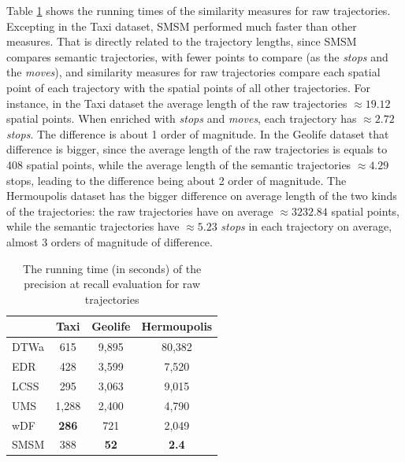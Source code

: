Table \ref{tab:running_time_raw} shows the running times of the similarity measures for raw trajectories. Excepting in the Taxi dataset, SMSM performed much faster than other measures. That is directly related to the trajectory lengths, since SMSM compares semantic trajectories, with fewer points to compare (as the \emph{stops} and the \emph{moves}), and similarity measures for raw trajectories compare each spatial point of each trajectory with the spatial points of all other trajectories. For instance, in the Taxi dataset the average length of the raw trajectories $\approx 19.12$ spatial points. When enriched with \emph{stops} and \emph{moves}, each trajectory has $\approx 2.72$ \emph{stops}. The difference is about 1 order of magnitude. In the Geolife dataset that difference is bigger, since the average length of the raw trajectories is equals to 408 spatial points, while the average length of the semantic trajectories $\approx 4.29$ stops, leading to the difference being about 2 order of magnitude. The Hermoupolis dataset has the bigger difference on average length of the two kinds of the trajectories: the raw trajectories have on average $\approx 3232.84$ spatial points, while the semantic trajectories have $\approx 5.23$ \emph{stops} in each trajectory on average, almost 3 orders of magnitude of difference.

\begin{table}[ht!]
  \scriptsize
  \centering
  \begin{tabular}{|l|c|c|c|}
  \hline
& Taxi & Geolife & Hermoupolis\\
  \hline
DTWa	& 615	& 9,895	& 80,382\\
EDR		& 428	& 3,599	& 7,520\\
LCSS	& 295	& 3,063	& 9,015\\
UMS		& 1,288	& 2,400	& 4,790\\
wDF		& \textbf{286}	& 721	& 2,049\\
SMSM    & 388 & \textbf{52} & \textbf{2.4}\\
    \hline
  \end{tabular}
  \caption{The running time (in seconds) of the precision at recall evaluation for raw trajectories}
  \label{tab:running_time_raw}
\end{table}

